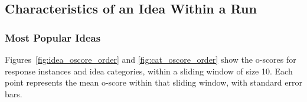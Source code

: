 

\subsection{Characteristics of an Idea Within a Run}

\subsubsection{Most Popular Ideas}

Figures~\ref{fig:idea_oscore_order} and \ref{fig:cat_oscore_order} show the o-scores for response instances and idea categories, within a sliding window of size 10. Each point represents the mean o-score within that sliding window, with standard error bars.







